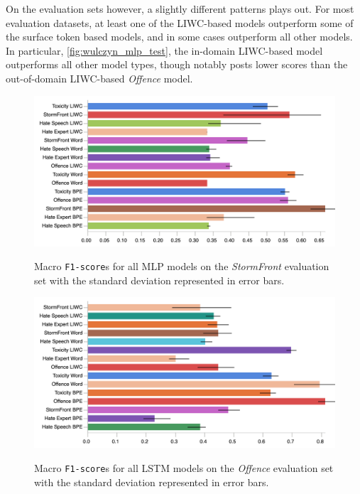 On the evaluation sets however, a slightly different patterns plays out. For most evaluation datasets, at least one of the LIWC-based models outperform some of the surface token based models, and in some cases outperform all other models. In particular, \cref{fig:wulczyn_mlp_test}, the in-domain LIWC-based model outperforms all other model types, though notably posts lower scores than the out-of-domain LIWC-based \textit{Offence} model.

\begin{figure}
\begin{minipage}{\textwidth}
\centering
  \includegraphics[width=\textwidth]{all_mlp_garcia_test.pdf}
  \caption{Macro \texttt{F1-score}s for all MLP models on the \textit{StormFront} evaluation set with the standard deviation represented in error bars.}
  \label{fig:garcia_mlp_test}
  \vfill
    \includegraphics[width=\textwidth]{all_lstm_davidson_test.pdf}
    \caption{Macro \texttt{F1-score}s for all LSTM models on the \textit{Offence} evaluation set with the standard deviation represented in error bars.}
    \label{fig:davidson_lstm_test}
  \end{minipage}
\end{figure}


